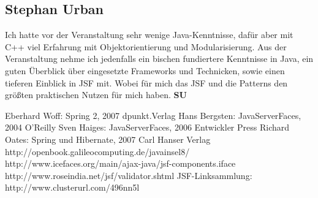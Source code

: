 \documentclass[titlepage, 12pt,a4paper]{scrartcl}
\makeatletter
\renewcommand*{\lstlistoflistings}{%
  \begingroup
    \if@twocolumn
      \@restonecoltrue\onecolumn
    \else
      \@restonecolfalse
    \fi
    \lol@heading
    \setlength{\parskip}{\z@}%
    \setlength{\parindent}{\z@}%
    \setlength{\parfillskip}{\z@ \@plus 1fil}%
    \@starttoc{lol}%
    \if@restonecol\twocolumn\fi
  \endgroup
}
\makeatother
\begin{document}
\subsection{Stephan Urban}
Ich hatte vor der Veranstaltung sehr wenige Java-Kenntnisse, dafür aber mit C++ viel Erfahrung mit Objektorientierung
und Modularisierung. Aus der Veranstaltung nehme ich jedenfalls ein bischen fundiertere Kenntnisse in Java, ein guten
Überblick über eingesetzte Frameworks und Technicken, sowie einen tieferen Einblick in JSF mit. Wobei für mich das JSF
und die Patterns den größten praktischen Nutzen für mich haben.
{\bf{SU}}

\newpage %

\listoffigures
\printindex
\begin{thebibliography}{99}
\bibitem{}
Eberhard Woff: Spring 2, 2007 dpunkt.Verlag
\bibitem{}
Hans Bergsten: JavaServerFaces, 2004 O'Reilly
\bibitem{}
Sven Haiges: JavaServerFaces, 2006 Entwickler Press
\bibitem{}
Richard Oates: Spring und Hibernate, 2007 Carl Hanser Verlag
\bibitem{}
http://openbook.galileocomputing.de/javainsel8/
\bibitem{}
http://www.icefaces.org/main/ajax-java/jsf-components.iface
\bibitem{}
http://www.roseindia.net/jsf/validator.shtml
\bibitem{}
JSF-Linksammlung: http://www.clusterurl.com/496nn5l

\end{thebibliography}
\end{document}
